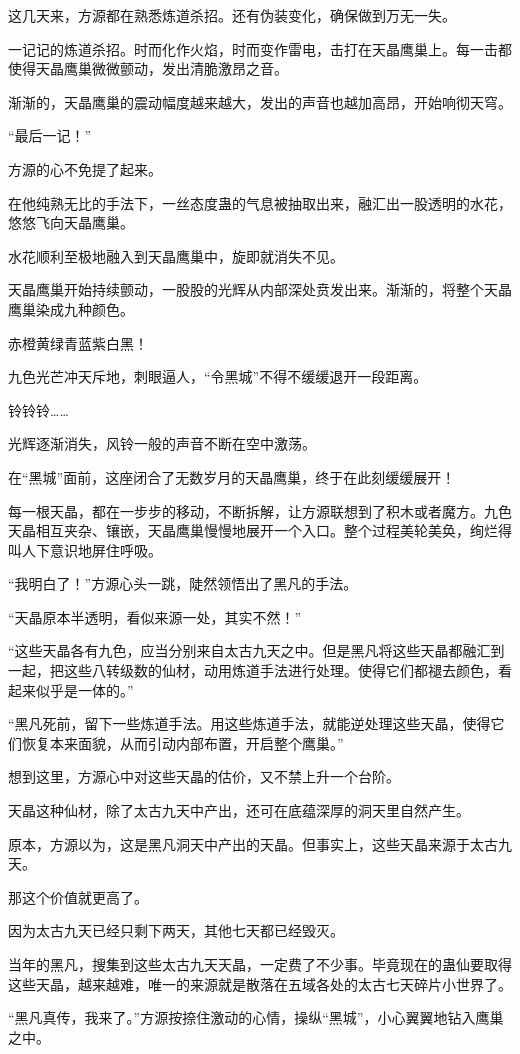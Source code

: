 \begin{this_body}
这几天来，方源都在熟悉炼道杀招。还有伪装变化，确保做到万无一失。

一记记的炼道杀招。时而化作火焰，时而变作雷电，击打在天晶鹰巢上。每一击都使得天晶鹰巢微微颤动，发出清脆激昂之音。

渐渐的，天晶鹰巢的震动幅度越来越大，发出的声音也越加高昂，开始响彻天穹。

“最后一记！”

方源的心不免提了起来。

在他纯熟无比的手法下，一丝态度蛊的气息被抽取出来，融汇出一股透明的水花，悠悠飞向天晶鹰巢。

水花顺利至极地融入到天晶鹰巢中，旋即就消失不见。

天晶鹰巢开始持续颤动，一股股的光辉从内部深处贲发出来。渐渐的，将整个天晶鹰巢染成九种颜色。

赤橙黄绿青蓝紫白黑！

九色光芒冲天斥地，刺眼逼人，“令黑城”不得不缓缓退开一段距离。

铃铃铃……

光辉逐渐消失，风铃一般的声音不断在空中激荡。

在“黑城”面前，这座闭合了无数岁月的天晶鹰巢，终于在此刻缓缓展开！

每一根天晶，都在一步步的移动，不断拆解，让方源联想到了积木或者魔方。九色天晶相互夹杂、镶嵌，天晶鹰巢慢慢地展开一个入口。整个过程美轮美奂，绚烂得叫人下意识地屏住呼吸。

“我明白了！”方源心头一跳，陡然领悟出了黑凡的手法。

“天晶原本半透明，看似来源一处，其实不然！”

“这些天晶各有九色，应当分别来自太古九天之中。但是黑凡将这些天晶都融汇到一起，把这些八转级数的仙材，动用炼道手法进行处理。使得它们都褪去颜色，看起来似乎是一体的。”

“黑凡死前，留下一些炼道手法。用这些炼道手法，就能逆处理这些天晶，使得它们恢复本来面貌，从而引动内部布置，开启整个鹰巢。”

想到这里，方源心中对这些天晶的估价，又不禁上升一个台阶。

天晶这种仙材，除了太古九天中产出，还可在底蕴深厚的洞天里自然产生。

原本，方源以为，这是黑凡洞天中产出的天晶。但事实上，这些天晶来源于太古九天。

那这个价值就更高了。

因为太古九天已经只剩下两天，其他七天都已经毁灭。

当年的黑凡，搜集到这些太古九天天晶，一定费了不少事。毕竟现在的蛊仙要取得这些天晶，越来越难，唯一的来源就是散落在五域各处的太古七天碎片小世界了。

“黑凡真传，我来了。”方源按捺住激动的心情，操纵“黑城”，小心翼翼地钻入鹰巢之中。

\end{this_body}

